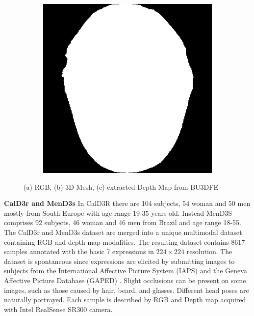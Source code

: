 \begin{figure}[H]
\begin{subfigure}{0.23\textwidth}
       \caption{}
       \label{BU3DFE_img_b}
   \end{subfigure}
   \begin{subfigure}{0.23\textwidth}
       \includegraphics[width=0.8\linewidth]{Images/BU3DFE_depth.png}
       \caption{}
       \label{BU3DFE_img_c}
   \end{subfigure}
   \caption{(a) RGB, (b) 3D Mesh, (c) extracted Depth Map from BU3DFE \protect\cite{BU3DFE}}
   \label{BU3DFE_img}
\end{figure}


 \textbf{CalD3r and MenD3s} \hspace{0.2cm} In CalD3R there are 104 subjects, 54 woman and 50 men mostly from South Europe with age range 19-35 years old. Instead MenD3S comprises 92 subjects, 46 woman and 46 men from Brazil and age range 18-55. The CalD3r and MenD3s dataset \cite{CalD3rMenD3s} are merged into a unique multimodal dataset containing RGB and depth map modalities. The resulting dataset contains 8617 samples annotated with the basic 7 expressions in $224\times224$ resolution. The dataset is spontaneous since expressions are elicited by submitting images to subjects from the International Affective Picture System (IAPS) \cite{IAPS} and the Geneva Affective Picture Database (GAPED) \cite{GAPED}. Slight occlusions can be present on some images, such as those caused by hair, beard, and glasses. Different head poses are naturally portrayed. Each sample is described by RGB and Depth map acquired with Intel RealSense SR300 camera.\\



